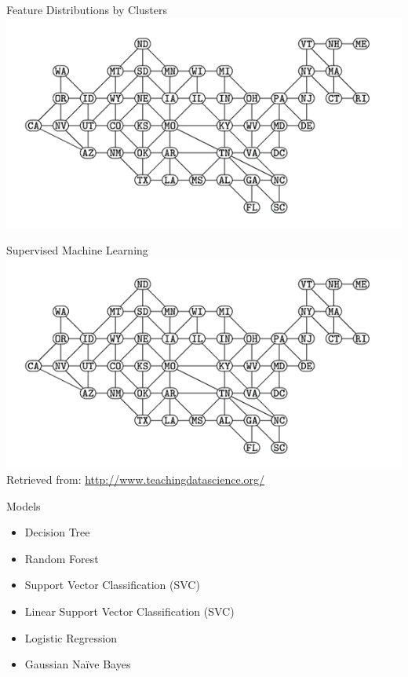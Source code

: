 \documentclass{beamer}
\begin{document}
\begin{frame}{Feature Distributions by Clusters}
    \centering
    \includegraphics[scale=0.23]{contiguous-usa-graph}
\end{frame}



\begin{frame}{Supervised Machine Learning}
    \centering
    \includegraphics[scale=.5]{contiguous-usa-graph}\\
    \tiny Retrieved from:  \url{http://www.teachingdatascience.org/}
\end{frame}

 


\begin{frame}{Models}
    \begin{itemize}
        \item Decision Tree
        \item Random Forest
        \item Support Vector Classification (SVC)
        \item Linear Support Vector Classification (SVC)
        \item Logistic Regression
        \item Gaussian Na\"ive Bayes
\end{itemize}

\end{frame}
\end{document}
